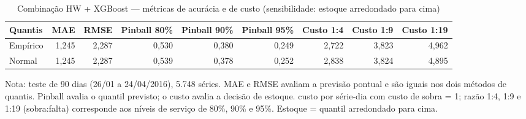 \begin{table}[htbp]
\centering
\small
\caption{Combinação HW + XGBoost — métricas de acurácia e de custo (sensibilidade: estoque arredondado para cima)}
\label{tab:comb_metricas_sensibilidade}
\begin{tabular}{lrrrrrrrr}
\toprule
Quantis & MAE & RMSE & Pinball 80\% & Pinball 90\% & Pinball 95\% & Custo 1:4 & Custo 1:9 & Custo 1:19 \\
\midrule
Empírico & 1,245 & 2,287 & 0,530 & 0,380 & 0,249 & 2,722 & 3,823 & 4,962 \\
Normal & 1,245 & 2,287 & 0,539 & 0,378 & 0,252 & 2,838 & 3,824 & 4,895 \\
\bottomrule
\end{tabular}
\par\smallskip
{\footnotesize Nota: teste de 90 dias (26/01 a 24/04/2016), 5.748 séries. MAE e RMSE avaliam a previsão pontual e são iguais nos dois métodos de quantis. Pinball avalia o quantil previsto; o custo avalia a decisão de estoque. custo por série-dia com custo de sobra = 1; razão 1:4, 1:9 e 1:19 (sobra:falta) corresponde aos níveis de serviço de 80\%, 90\% e 95\%. Estoque = quantil arredondado para cima.}
\end{table}
